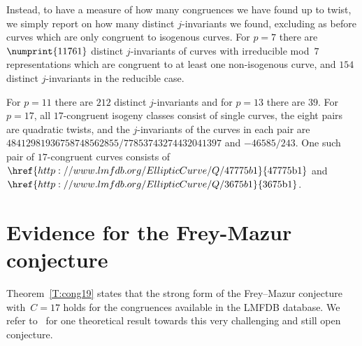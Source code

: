 \documentclass[twoside,leqno,symbols-for-thanks, draft]{rmi}
\numberwithin{equation}{section}
\newcommand{\lmfdbec}[3]{\href{http://www.lmfdb.org/EllipticCurve/Q/#1#2#3}{{\text{\rm#1#2#3}}}}
\theoremstyle{remark}
\begin{document}
Instead, to have a measure of how many congruences we have found up to
twist, we simply report on how many distinct $j$-invariants we found,
excluding as before curves which are only congruent to isogenous
curves.  For $p=7$ there are $\numprint{11761}$ distinct
$j$-invariants of curves with irreducible mod~$7$ representations
which are congruent to at least one non-isogenous curve, and $154$
distinct $j$-invariants in the reducible case.

For $p=11$ there are $212$ distinct $j$-invariants and for $p=13$
there are $39$.  For $p=17$, all $17$-congruent isogeny classes
consist of single curves, the eight pairs are quadratic twists, and
the $j$-invariants of the curves in each pair are
$48412981936758748562855/77853743274432041397$ and $-46585/243$.  One
such pair of $17$-congruent curves consists of $\lmfdbec{47775}{b}{1}$
and~$\lmfdbec{3675}{b}{1}$.

\section{Evidence for the Frey-Mazur conjecture}
\label{S:Frey-Mazur}

Theorem~\ref{T:cong19} states that the strong form of the
Frey--Mazur conjecture with~$C=17$ holds for the congruences available
in the LMFDB database. We refer to~\cite{Halberstadt-Kraus-FreyMazur}
for one theoretical result towards this very challenging and still
open conjecture.
\end{document}
